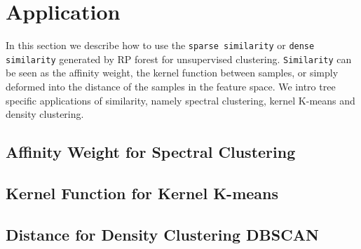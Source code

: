 \section{Application}
In this section we describe how to use the \texttt{sparse similarity} or \texttt{dense similarity} generated by RP forest for unsupervised clustering.
\texttt {Similarity} can be seen as the affinity weight, the kernel function between samples, or simply deformed into the distance of the samples in the feature space. We intro tree specific applications of similarity, namely spectral clustering, kernel K-means and density clustering.

\subsection{Affinity Weight for Spectral Clustering}
\subsection{Kernel Function for Kernel K-means}
\subsection{Distance for Density Clustering DBSCAN}